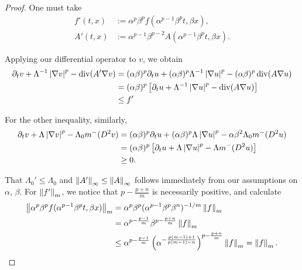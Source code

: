 \begin{proof}
One must take
\begin{align*}
f'(t,x) &:= \alpha^p \beta^p f(\alpha^{p-1}\beta^p t, \beta x), \\
A'(t,x) &:= \alpha^{p-1}\beta^{p-2} A(\alpha^{p-1}\beta^p t, \beta x).
\end{align*}

Applying our differential operator to $v$, we obtain 
\begin{align*}
\partial_t v + \Lambda^{-1} \left\lvert \nabla v \right\rvert^p - \operatorname{div}(A' \nabla v) &= (\alpha\beta)^p \partial_t u + (\alpha\beta)^p \Lambda^{-1} \left\lvert \nabla u \right\rvert^p - (\alpha \beta)^p  \operatorname{div}(A \nabla u)
\\ &= (\alpha\beta)^p \left[ \partial_t u + \Lambda^{-1} \left\lvert \nabla u \right\rvert^p - \operatorname{div} (A \nabla u) \right]
\\ &\leq f'
\end{align*}

For the other inequality, similarly, 
\begin{align*}
\partial_t v + \Lambda \left\lvert \nabla v \right\rvert^p - \Lambda_0 m^-(D^2 v) &= (\alpha\beta)^p \partial_t u + (\alpha\beta)^p \Lambda \left\lvert \nabla u \right\rvert^p - \alpha \beta^2 \Lambda_0 m^-(D^2 u)
\\ &= (\alpha\beta)^p \left[ \partial_t u + \Lambda \left\lvert \nabla u \right\rvert^p - \Lambda m^-(D^2 u) \right]
\\ &\geq 0.
\end{align*}


That $\Lambda_0' \leq \Lambda_0$ and $\left\lVert A'\right\rVert_\infty \leq \left\lVert A\right\rVert_\infty$ follows immediately from our assumptions on $\alpha$, $\beta$.  For $\left\lVert f'\right\rVert_m$, we notice that $p - \frac{p+n}{m}$ is necessarily positive, and calculate
\begin{align*}
\left\lVert\alpha^p \beta^p f(\alpha^{p-1}\beta^p t, \beta x)\right\rVert_m &= \alpha^p \beta^p (\alpha^{p-1}\beta^p \beta^n )^{-1/m} \left\lVert f\right\rVert_m 
\\ &= \alpha^{p - \frac{p-1}{m}} \beta^{p - \frac{p+n}{m}} \left\lVert f\right\rVert_m
\\ &\leq \alpha^{p - \frac{p-1}{m}} \left( \alpha^{-\frac{p(m-1)+1}{p(m-1) - n} } \right)^{p - \frac{p+n}{m}} \left\lVert f\right\rVert_m = \left\lVert f\right\rVert_m.
\end{align*}

\end{proof}


